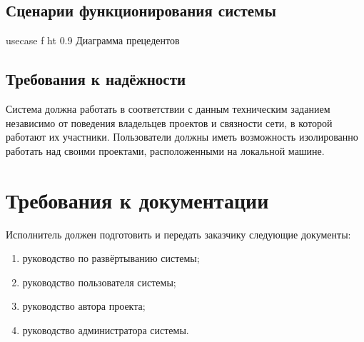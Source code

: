 \documentclass{bmstu}
\begin{document}
  \subsection{Сценарии функционирования системы}

    {usecase}
    {f}
    {ht}
    {0.9 \textwidth}
    {Диаграмма прецедентов}

  \subsection{Требования к надёжности}

  Система должна работать в соответствии с данным техническим заданием
  независимо от поведения владельцев проектов и связности сети, в
  которой работают их участники.
  Пользователи должны иметь возможность изолированно работать над
  своими проектами, расположенными на локальной машине.

  \section{Требования к документации}

  Исполнитель должен подготовить и передать заказчику следующие
  документы:
  \begin{enumerate}[label*=\arabic*)]
    \item руководство по развёртыванию системы;
    \item руководство пользователя системы;
    \item руководство автора проекта;
    \item руководство администратора системы.
  \end{enumerate}
\end{document}
